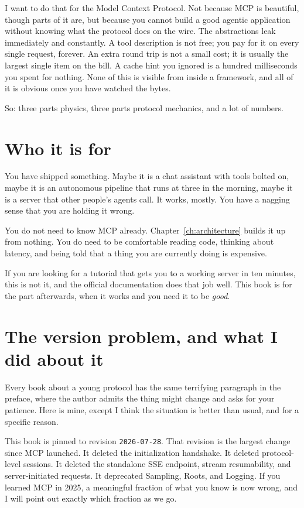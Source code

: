 I want to do that for the Model Context Protocol. Not because MCP is beautiful,
though parts of it are, but because you cannot build a good agentic application
without knowing what the protocol does on the wire. The abstractions leak
immediately and constantly. A tool description is not free; you pay for it on
every single request, forever. An extra round trip is not a small cost; it is
usually the largest single item on the bill. A cache hint you ignored is a
hundred milliseconds you spent for nothing. None of this is visible from
inside a framework, and all of it is obvious once you have watched the bytes.

So: three parts physics, three parts protocol mechanics, and a lot of numbers.

\section*{Who it is for}

You have shipped something. Maybe it is a chat assistant with tools bolted on,
maybe it is an autonomous pipeline that runs at three in the morning, maybe it
is a server that other people's agents call. It works, mostly. You have a
nagging sense that you are holding it wrong.

You do not need to know MCP already. Chapter~\ref{ch:architecture} builds it up
from nothing. You do need to be comfortable reading code, thinking about
latency, and being told that a thing you are currently doing is expensive.

If you are looking for a tutorial that gets you to a working server in ten
minutes, this is not it, and the official documentation does that job well.
This book is for the part afterwards, when it works and you need it to be
\emph{good}.

\section*{The version problem, and what I did about it}

Every book about a young protocol has the same terrifying paragraph in the
preface, where the author admits the thing might change and asks for your
patience. Here is mine, except I think the situation is better than usual, and
for a specific reason.

This book is pinned to revision \texttt{2026-07-28}. That revision is the
largest change since MCP launched. It deleted the initialization handshake. It
deleted protocol-level sessions. It deleted the standalone SSE endpoint,
stream resumability, and server-initiated requests. It deprecated Sampling,
Roots, and Logging. If you learned MCP in 2025, a meaningful fraction of what
you know is now wrong, and I will point out exactly which fraction as we go.

